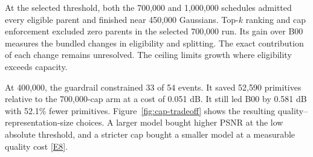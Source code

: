 At the selected threshold, both the 700,000 and 1,000,000 schedules admitted every eligible parent and finished near 450,000 Gaussians. Top-$k$ ranking and cap enforcement excluded zero parents in the selected 700,000 run. Its gain over B00 measures the bundled changes in eligibility and splitting. The exact contribution of each change remains unresolved. The ceiling limits growth where eligibility exceeds capacity.

At 400,000, the guardrail constrained 33 of 54 events. It saved 52,590 primitives relative to the 700,000-cap arm at a cost of 0.051 dB. It still led B00 by 0.581 dB with 52.1\% fewer primitives. Figure~\ref{fig:cap-tradeoff} shows the resulting quality--representation-size choices. A larger model bought higher PSNR at the low absolute threshold, and a stricter cap bought a smaller model at a measurable quality cost [\hyperlink{evE8}{E8}].
